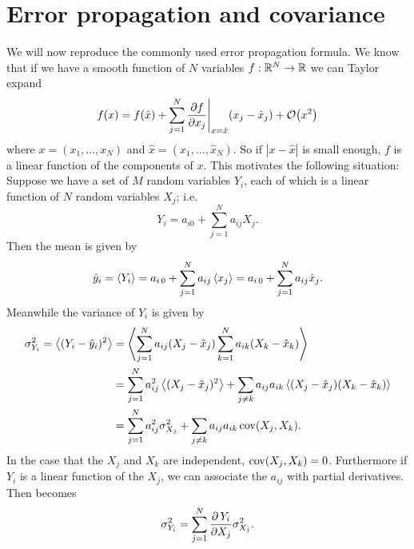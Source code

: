 \section{Error propagation and covariance}\label{sec:prop}
We will now reproduce the commonly used error propagation formula. We know
that if we have a smooth function of $N$ variables 
$f:\mathbb{R}^N\to\mathbb{R}$ we can Taylor expand
\begin{equation}
  f(x)=f(\hat{x})+\sum_{j=1}^N
        \frac{\partial f}{\partial x_j}\Bigg|_{x=\hat{x}}(x_j-\hat{x}_j)
        +\order{x^2}
\end{equation}
where $x=(x_1,...,x_N)$ and $\hat{x}=(\hat{x}_1,...,\hat{x}_N)$. So if 
$|x-\hat{x}|$ is small enough, $f$ is a linear function of the components 
of $x$. This motivates the following situation: Suppose we have a set of 
$M$ random variables $Y_i$, each of which is a linear function of $N$ 
random variables $X_j$; i.e.
\begin{equation}\label{eq:lintran}
  Y_i=a_{i0}+\sum_{j=1}^N a_{ij}X_j.
\end{equation}
Then the mean is given by
\begin{equation}
  \hat{y}_i=\ev{Y_i}=a_{i\,0}+\sum_{j=1}^N a_{ij}\ev{x_j}
           =a_{i\,0}+\sum_{j=1}^N a_{ij}\hat{x}_j.
\end{equation}
Meanwhile the variance of $Y_i$ is given by
\begin{equation}\label{eq:linprop}
  \begin{aligned}
    \sigma^2_{Y_i}=\ev{(Y_i-\hat{y}_i)^2}
              &=\ev{\sum_{j=1}^N a_{ij}(X_j-\hat{x}_j)
                   \sum_{k=1}^N a_{ik}(X_k-\hat{x}_k)}\\
              &=\sum_{j=1}^N a_{ij}^2\ev{(X_j-\hat{x}_j)^2}
               +\sum_{j\neq k}a_{ij}a_{ik}
                \ev{(X_j-\hat{x}_j)(X_k-\hat{x}_k)}\\
              &=\sum_{j=1}^N a_{ij}^2\sigma^2_{X_j}
               +\sum_{j\neq k}a_{ij}a_{ik}\Cov(X_j,X_k).
  \end{aligned}
\end{equation}
In the case that the $X_j$ and $X_k$ are independent, $\operatorname{cov}(X_j,X_k)=0$.
Furthermore if $Y_i$ is a linear function of the $X_j$, we 
can associate the $a_{ij}$ with partial derivatives. Then 
 becomes
\begin{equation}\label{eq:errprop}\index{error propagation formula}
  \sigma^2_{Y_i}=
   \sum_{j=1}^N\frac{\partial\,Y_i}{\partial X_j}\sigma_{X_j}^2.
\end{equation}
